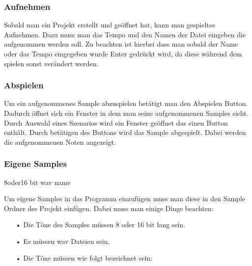 \subsubsection{Aufnehmen}

Sobald man ein Projekt erstellt und geöffnet hat, kann man gespieltes Aufnehmen. Dazu muss man das Tempo und den Namen der Datei eingeben die aufgenommen werden soll. Zu beachten ist hierbei dass man sobald der Name oder das Tempo eingegeben wurde Enter gedrückt wird, da diese während dem spielen sonst verändert werden.









\subsubsection{Abspielen}

Um ein aufgenommenes Sample abzuspielen betätigt man den Abspielen Button. Dadurch öffnet sich ein Fenster in dem man seine aufgenommenen Samples sieht. Durch Auswahl eines Szenarios wird ein Fenster geöffnet das einen Button enthält. Durch betätigen des Buttons wird das Sample abgespielt. Dabei werden die aufgenommenen Noten angezeigt. 



\subsubsection{Eigene Samples}
 8oder16 bit wav  name 
 
 Um eigene Samples in das Programm einzufügen muss man diese in den Sample Ordner des Projekt einfügen. Dabei muss man einige Dinge beachten:
 
 \begin{itemize}
   \item[•] Die Töne des Samples müssen 8 oder 16 bit lang sein.
   \item[•] Es müssen wav Dateien sein.
   \item[•] Die Töne müssen wie folgt bezeichnet sein:
   	
   
 \end{itemize}            
             
             
             
             
             
             
             
             
             
             
             
             
             
             
             